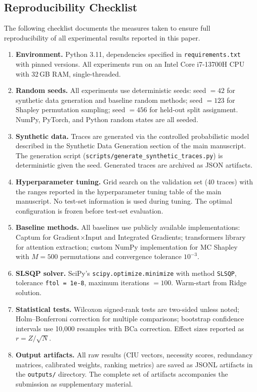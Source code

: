 \documentclass[a4paper,fleqn]{cas-sc}
\begin{document}
\subsection{Reproducibility Checklist}
\label{app:repro-checklist}

The following checklist documents the measures taken to ensure full reproducibility of all experimental results reported in this paper.

\begin{enumerate}
\item \textbf{Environment.} Python 3.11, dependencies specified in \texttt{requirements.txt} with pinned versions. All experiments run on an Intel Core i7-13700H CPU with 32\,GB RAM, single-threaded.
\item \textbf{Random seeds.} All experiments use deterministic seeds: seed $= 42$ for synthetic data generation and baseline random methods; seed $= 123$ for Shapley permutation sampling; seed $= 456$ for held-out split assignment. NumPy, PyTorch, and Python random states are all seeded.
\item \textbf{Synthetic data.} Traces are generated via the controlled probabilistic model described in the Synthetic Data Generation section of the main manuscript. The generation script (\texttt{scripts/generate\_synthetic\_traces.py}) is deterministic given the seed. Generated traces are archived as JSON artifacts.
\item \textbf{Hyperparameter tuning.} Grid search on the validation set (40 traces) with the ranges reported in the hyperparameter tuning table of the main manuscript. No test-set information is used during tuning. The optimal configuration is frozen before test-set evaluation.
\item \textbf{Baseline methods.} All baselines use publicly available implementations: Captum for Gradient$\times$Input and Integrated Gradients; transformers library for attention extraction; custom NumPy implementation for MC Shapley with $M = 500$ permutations and convergence tolerance $10^{-3}$.
\item \textbf{SLSQP solver.} SciPy's \texttt{scipy.optimize.minimize} with method \texttt{SLSQP}, tolerance \texttt{ftol = 1e-8}, maximum iterations $= 100$. Warm-start from Ridge solution.
\item \textbf{Statistical tests.} Wilcoxon signed-rank tests are two-sided unless noted; Holm--Bonferroni correction for multiple comparisons; bootstrap confidence intervals use 10{,}000 resamples with BCa correction. Effect sizes reported as $r = Z/\sqrt{N}$.
\item \textbf{Output artifacts.} All raw results (CIU vectors, necessity scores, redundancy matrices, calibrated weights, ranking metrics) are saved as JSONL artifacts in the \texttt{outputs/} directory. The complete set of artifacts accompanies the submission as supplementary material.
\end{enumerate}
\end{document}
